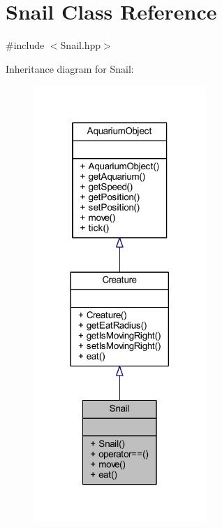 \hypertarget{class_snail}{}\section{Snail Class Reference}
\label{class_snail}


{\ttfamily \#include $<$Snail.\+hpp$>$}



Inheritance diagram for Snail\+:\nopagebreak
\begin{figure}[H]
\begin{center}
\leavevmode
\includegraphics[width=185pt]{class_snail__inherit__graph}
\end{center}
\end{figure}


